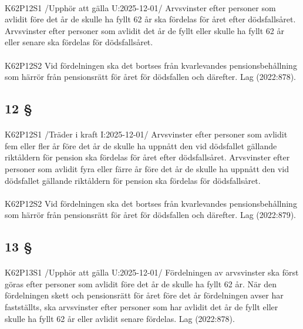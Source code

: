 \documentclass[a4paper,notitlepage,openany,10pt]{book}
\begin{document}
\paragraph*{}
{\tiny K62P12S1}
/Upphör att gälla U:2025-12-01/
Arvsvinster efter personer som avlidit före det år de skulle ha fyllt 62 år ska fördelas för året efter dödsfallsåret. Arvsvinster efter personer som avlidit det år de fyllt eller skulle ha fyllt 62 år eller senare ska fördelas för dödsfallsåret.
\paragraph*{}
{\tiny K62P12S2}
Vid fördelningen ska det bortses från kvarlevandes pensionsbehållning som härrör från pensionsrätt för året för dödsfallen och därefter.
Lag (2022:878).
\subsection*{12 §}
\paragraph*{}
{\tiny K62P12S1}
/Träder i kraft I:2025-12-01/
Arvsvinster efter personer som avlidit fem eller fler år före det år de skulle ha uppnått den vid dödsfallet gällande riktåldern för pension ska fördelas för året efter dödsfallsåret. Arvsvinster efter personer som avlidit fyra eller färre år före det år de skulle ha uppnått den vid dödsfallet gällande riktåldern för pension ska fördelas för dödsfallsåret.
\paragraph*{}
{\tiny K62P12S2}
Vid fördelningen ska det bortses från kvarlevandes pensionsbehållning som härrör från pensionsrätt för året för dödsfallen och därefter.
Lag (2022:879).
\subsection*{13 §}
\paragraph*{}
{\tiny K62P13S1}
/Upphör att gälla U:2025-12-01/
Fördelningen av arvsvinster ska först göras efter personer som avlidit före det år de skulle ha fyllt 62 år. När den fördelningen skett och pensionsrätt för året före det år fördelningen avser har fastställts, ska arvsvinster efter personer som har avlidit det år de fyllt eller skulle ha fyllt 62 år eller avlidit senare fördelas.
Lag (2022:878).
\end{document}
